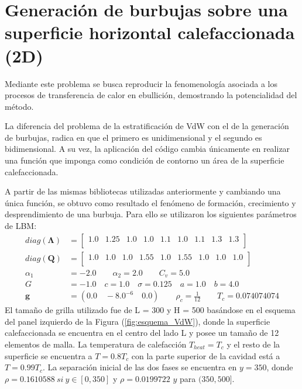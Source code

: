 \newpage
\newpage
\section{Generación de burbujas sobre una superficie horizontal calefaccionada (2D)}

Mediante este problema se busca reproducir la fenomenología asociada a los procesos de transferencia de calor en ebullición, demostrando la potencialidad del método. 

La diferencia del problema de la estratificación de VdW con el de la generación de burbujas, radica en que el primero es unidimensional y el segundo es bidimensional. A su vez, la aplicación del código cambia únicamente en realizar una función que imponga como condición de contorno un área de la superficie calefaccionada.

A partir de las mismas bibliotecas utilizadas anteriormente y cambiando una única función, se obtuvo como resultado el fenómeno de formación, crecimiento y desprendimiento de una burbuja. Para ello se utilizaron los siguientes parámetros de LBM:
{\footnotesize \begin{align*}
diag(\mathbf{\Lambda}) & = 
\begin{bmatrix}
1.0 & 1.25 & 1.0 & 1.0 & 1.1 & 1.0 & 1.1 & 1.3 & 1.3 \\
\end{bmatrix}\\
diag(\mathbf{Q}) & = 
\begin{bmatrix}
1.0 & 1.0 & 1.0 & 1.55 & 1.0 & 1.55 & 1.0 & 1.0 & 1.0 \\
\end{bmatrix}\\
\alpha_{1} & = -2.0 \qquad 	\alpha_{2} = 2.0 \qquad C_{v} = 5.0\\
G & = -1.0 \quad c = 1.0 \quad \sigma = 0.125 \quad a = 1.0 \quad b = 4.0 \\
\mathbf{g} & = (0.0 \quad -8.0^{-6} \quad 0.0 ) \qquad \rho_c = \frac{1}{12} \qquad T_c = 0.074074074
\end{align*}}
El tamaño de grilla utilizado fue de L = 300 y H = 500 basándose en el esquema del panel izquierdo de la Figura (\ref{fig:esquema_VdW}), donde la superficie calefaccionada se encuentra en el centro del lado L y posee un tamaño de 12 elementos de malla. La temperatura de calefacción $T_{heat} = T_c$  y el resto de la superficie se encuentra a $T = 0.8 T_c$ con la parte superior de la cavidad está a $T = 0.99 T_c$. La separación inicial de las dos fases se encuentra en $y = 350$, donde $\rho = 0.1610588 \> si \> y \in [0,350]$ y $\rho = 0.0199722$ $y$ para $(350,500]$.

